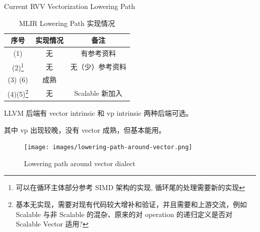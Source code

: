 \documentclass[aspectratio=169]{ctexbeamer}
\begin{document}
\begin{frame}{Current RVV Vectorization Lowering Path}
    \begin{minipage}[t]{0.5\textwidth}
        \begin{table}
            \scriptsize
            \centering
            \caption{MLIR Lowering Path 实现情况}
            \begin{tabular}{ccc}
                \toprule
                序号                                                                                                                            & 实现情况 & 备注           \\
                \midrule
                (1)                                                                                                                           & 无    & 有参考资料        \\
                (2)\footnote{\tiny 可以在循环主体部分参考 SIMD 架构的实现, 循环尾的处理需要新的实现}                                                                      & 无    & 无（少）参考资料     \\
                (3) (6)                                                                                                                       & 成熟   &              \\
                (4)(5)\footnote{\tiny 基本无实现，需要对现有代码较大增补和验证，并且需要和上游交流，例如 Scalable 与非 Scalable 的混杂、原来的对 operation 的递归定义是否对 Scalable Vector 适用?} & 无    & Scalable 新加入 \\
                \bottomrule
            \end{tabular}
        \end{table}

        \scriptsize
        LLVM 后端有 vector intrinsic 和 vp intrinsic 两种后端可选。

        其中 vp 出现较晚，没有 vector 成熟，但基本能用。
    \end{minipage}%
    \begin{minipage}[t]{0.5\textwidth}
        \begin{figure}
            \centering
            \texttt{[image: images/lowering-path-around-vector.png]}
            \caption{Lowering path around vector dialect}
        \end{figure}
    \end{minipage}
\end{frame}
\end{document}
